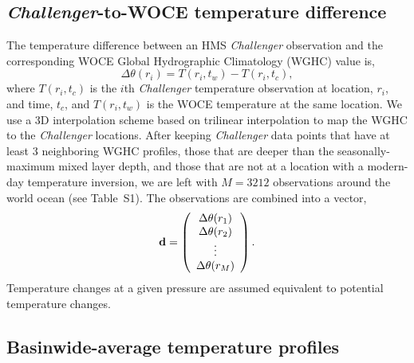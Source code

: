 \documentclass[12pt]{article}
\begin{document}
\subsection{{\it Challenger}-to-WOCE temperature difference}

The temperature difference between an HMS {\it Challenger} observation and the corresponding WOCE Global Hydrographic Climatology (WGHC) value \cite{Gouretski-Koltermann-2004:WOCE} is, 
\begin{equation}
\Delta \theta(r_i) = T(r_i,t_w) - T(r_i,t_c),
\end{equation}
where $T(r_i,t_c)$ is the $i$th {\it Challenger} temperature observation at location, $r_i$, and time, $t_c$, and  $T(r_i,t_w)$ is the WOCE temperature at the same location. 
We use a 3D interpolation scheme based on trilinear interpolation to map the WGHC to the {\it Challenger} locations. 
After keeping {\it Challenger} data points that have at least 3 neighboring WGHC profiles, those that are deeper than the seasonally-maximum mixed layer depth, and those that are not at a location with a modern-day temperature inversion, we are left with $M=3212$ observations around the world ocean (see Table~S1). The observations are combined into a vector,
\begin{equation}
{\bf d} = \left(\begin{array}{c} \Delta \theta(r_1) \\ \Delta \theta(r_2) \\ \vdots \\ \Delta \theta(r_M) 
 \end{array} \right) .
\end{equation}
Temperature changes at a given pressure are assumed equivalent to potential temperature changes.

\subsection{Basinwide-average temperature profiles}
\end{document}
